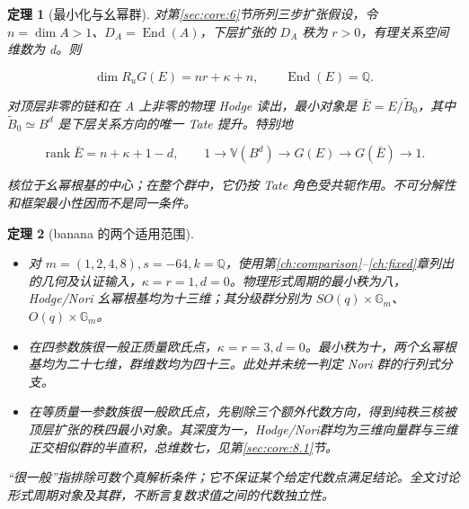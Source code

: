 \documentclass[11pt,a4paper,oneside]{ctexrep}
\theoremstyle{cnplain}
\newtheorem{theorem}{定理}[chapter]
\theoremstyle{definition}
\theoremstyle{remark}
\newcommand{\tightlist}{\setlength{\itemsep}{0pt}\setlength{\parskip}{0pt}}
\begin{document}
\begin{theorem}[最小化与幺幂群]

\label{thm:core:B} 对第\ref{sec:core:6}节所列三步扩张假设，令 \(n=\dim A>1\)、\(D_A=\operatorname{End}(A)\)，下层扩张的 \(D_A\) 秩为 \(r>0\)，有理关系空间维数为 d。则

\begin{equation}
\dim R_uG(E)=nr+\kappa+n,\qquad
 \operatorname{End}(E)=\mathbb Q.                         \label{eq:core:1.6}
\end{equation}

对顶层非零的链和在 A 上非零的物理 Hodge 读出，最小对象是 \(\bar E=E/\widetilde B_0\)，其中 \(\widetilde B_0\simeq B^d\) 是下层关系方向的唯一 Tate 提升。特别地

\begin{equation}
\operatorname{rank}\bar E=n+\kappa+1-d,
 \qquad 1\longrightarrow\mathbb V(B^d)
 \longrightarrow G(E)\longrightarrow G(\bar E)\longrightarrow1. \label{eq:core:1.7}
\end{equation}

核位于幺幂根基的中心；在整个群中，它仍按 Tate 角色受共轭作用。不可分解性和框架最小性因而不是同一条件。

\end{theorem}

\begin{theorem}[banana 的两个适用范围]

\label{thm:core:C}

\begin{itemize}
\tightlist
\item
  对 \(m=(1,2,4,8),s=-64,k=\mathbb Q\)，使用第\ref{ch:comparison}--\ref{ch:fixed}章列出的几何及认证输入，\(\kappa=r=1,d=0\)。物理形式周期的最小秩为八，Hodge/Nori 幺幂根基均为十三维；其分级群分别为 \(SO(q)\times\mathbb G_m\)、\(O(q)\times\mathbb G_m\)。
\item
  在四参数族很一般正质量欧氏点，\(\kappa=r=3,d=0\)。最小秩为十，两个幺幂根基均为二十七维，群维数均为四十三。此处并未统一判定 Nori 群的行列式分支。
\item
  在等质量一参数族很一般欧氏点，先剔除三个额外代数方向，得到纯秩三核被顶层扩张的秩四最小对象。其深度为一，Hodge/Nori群均为三维向量群与三维正交相似群的半直积，总维数七，见第\ref{sec:core:8.1}节。
\end{itemize}

``很一般''指排除可数个真解析条件；它不保证某个给定代数点满足结论。全文讨论形式周期对象及其群，不断言复数求值之间的代数独立性。

\end{theorem}
\end{document}
